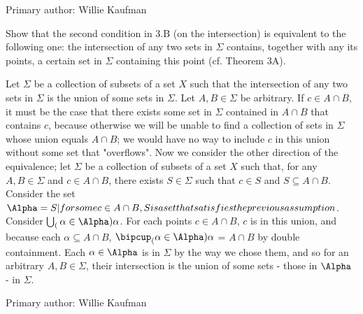 Primary author: Willie Kaufman

\begin{majorEx}%
Show that the second condition in 3.B (on the intersection) is equivalent to the following one: the intersection of any two sets in $\Sigma$ contains, together with any its points, a certain set in $\Sigma$ containing this point (cf. Theorem 3A).
\end{majorEx}
Let $\Sigma$ be a collection of subsets of a set $X$ such that the intersection of any two sets in $\Sigma$ is the union of some sets in $\Sigma$. Let $A, B \in \Sigma$ be arbitrary. If $c \in A \cap B$, it must be the case that there exists some set in $\Sigma$ contained in $A \cap B$ that contains $c$, because otherwise we will be unable to find a collection of sets in $\Sigma$ whose union equals $A \cap B$; we would have no way to include $c$ in this union without some set that "overflows".
Now we consider the other direction of the equivalence; let $\Sigma$ be a collection of subsets of a set $X$ such that, for any $A, B \in \Sigma$ and $c \in A \cap B$, there exists $S \in \Sigma$ such that $c \in S$ and $S \subseteq A \cap B$. Consider the set $\Alpha = {S | for some c \in A \cap B, S is a set that satisfies the previous assumption}$. Consider $\bigcup_(\alpha \in \Alpha) \alpha$. For each points $c \in A \cap B$, $c$ is in this union, and because each $\alpha \subseteq A \cap B$, $\bipcup_(\alpha \in \Alpha) \alpha$ = $A \cap B$ by double containment. Each $\alpha \in \Alpha$ is in $\Sigma$ by the way we chose them, and so for an arbitrary $A, B \in \Sigma$, their intersection is the union of some sets - those in $\Alpha$ - in $\Sigma$.

Primary author: Willie Kaufman
